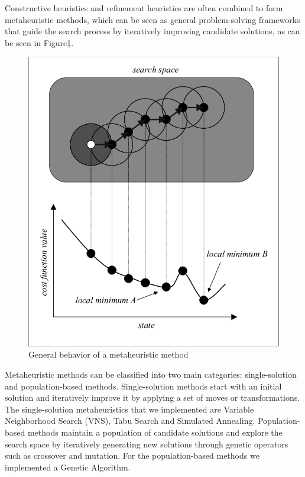 
Constructive heuristics and refinement heuristics  are often combined to form metaheuristic methods, which can be seen as general problem-solving frameworks that guide the search process by iteratively improving candidate solutions, as can be seen in Figure\ref{fig:metaheur}.

\begin{figure}[!h]
    \centering
    \includegraphics[]{images/metaheuristics.png}
    \caption{General behavior of a metaheuristic method}
    \label{fig:metaheur}
\end{figure}

Metaheuristic methods can be classified into two main categories: single-solution and population-based methods. Single-solution methods start with an initial solution and iteratively improve it by applying a set of moves or transformations. The single-solution metaheuristics that we implemented are Variable Neighborhood Search (VNS), Tabu Search and Simulated Annealing. Population-based methods maintain a population of candidate solutions and explore the search space by iteratively generating new solutions through genetic operators such as crossover and mutation. For the population-based methods we implemented a Genetic Algorithm.





